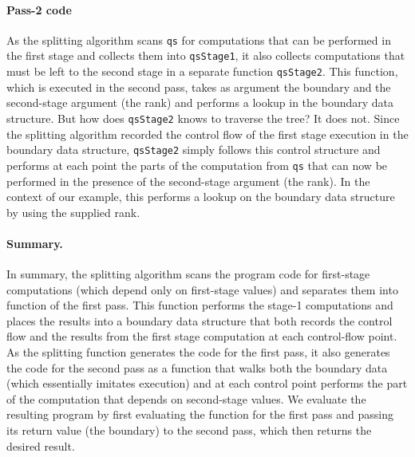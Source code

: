 \begin{abstrsyn}
\paragraph{Pass-2 code}
As the splitting algorithm scans \texttt{qs} for computations that can
be performed in the first stage and collects them into
\texttt{qsStage1}, it also collects computations that must be left to
the second stage in a separate function \texttt{qsStage2}.  This
function, which is executed in the second pass, takes as argument the
boundary and the second-stage argument (the rank) and performs a
lookup in the boundary data structure.  But how does \texttt{qsStage2}
knows to traverse the tree? It does not. Since the splitting algorithm
recorded the control flow of the first stage execution in the boundary
data structure, \texttt{qsStage2} simply follows this control
structure and performs at each point the parts of the computation from
\texttt{qs} that can now be performed in the presence of the
second-stage argument (the rank).  In the context of our example, this
performs a lookup on the boundary data structure by using the supplied
rank.  

\paragraph{Summary.}
In summary, the splitting algorithm scans the program code for
first-stage computations (which depend only on first-stage values) and
separates them into function of the first pass. This function performs
the stage-1 computations and places the results into a boundary data
structure that both records the control flow and the results from the
first stage computation at each control-flow point.  As the splitting
function generates the code for the first pass, it also generates the
code for the second pass as a function that walks both the boundary
data (which essentially imitates execution) and at each control point
performs the part of the computation that depends on second-stage
values. We evaluate the resulting program by first evaluating the
function for the first pass and passing its return value (the
boundary) to the second pass, which then returns the desired result.



\begin{comment}

An astute programmer, having noticed that \texttt{quickselect} can be staged in
this fashion, might try to split it into a pair of functions, one which performs
all the work depending only on \texttt{l} (the first stage), and one which uses
that partial result and \texttt{k} to compute the element with
rank \texttt{k} in \texttt{l}. 


\end{comment}
\end{abstrsyn}
